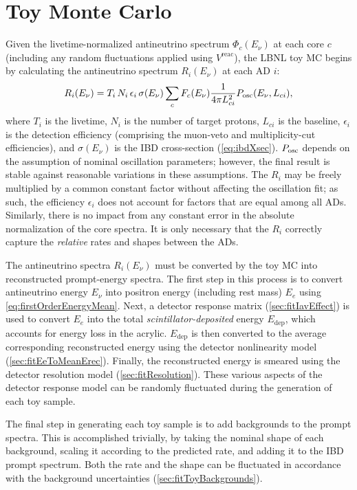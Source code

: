 \documentclass[../thesis.tex]{subfiles}
\begin{document}
\section{Toy Monte Carlo}
\label{sec:fittingToyMC}

Given the livetime-normalized antineutrino spectrum $\Phi_c(E_\nu)$ at each core $c$ (including any random fluctuations applied using $V^{\mathrm{reac}}$), the LBNL toy MC begins by calculating the antineutrino spectrum $R_i(E_\nu)$ at each AD $i$:
\begin{equation}
  \label{eq:fitTrueIbdSpecOverview}
  R_i(E_\nu) = T_i\,N_i\,\epsilon_i\,\sigma(E_\nu) \sum_c F_c(E_\nu) \frac{1}{4\pi L_{ci}^2}
  P_\mathrm{osc}(E_\nu, L_{ci}),
\end{equation}
where $T_i$ is the livetime, $N_i$ is the number of target protons, $L_{ci}$ is the baseline, $\epsilon_i$ is the detection efficiency (comprising the muon-veto and multiplicity-cut efficiencies), and $\sigma(E_\nu)$ is the IBD cross-section (\autoref{eq:ibdXsec}). $P_\mathrm{osc}$ depends on the assumption of nominal oscillation parameters; however, the final result is stable against reasonable variations in these assumptions. The $R_i$ may be freely multiplied by a common constant factor without affecting the oscillation fit; as such, the efficiency $\epsilon_i$ does not account for factors that are equal among all ADs. Similarly, there is no impact from any constant error in the absolute normalization of the core spectra. It is only necessary that the $R_i$ correctly capture the \emph{relative} rates and shapes between the ADs.

The antineutrino spectra $R_i(E_\nu)$ must be converted by the toy MC into reconstructed prompt-energy spectra. The first step in this process is to convert antineutrino energy $E_\nu$ into positron energy (including rest mass) $E_e$ using \autoref{eq:firstOrderEnergyMean}. Next, a detector response matrix (\autoref{sec:fitIavEffect}) is used to convert $E_e$ into the total \emph{scintillator-deposited} energy $E_{\mathrm{dep}}$, which accounts for energy loss in the acrylic. $E_{\mathrm{dep}}$ is then converted to the average corresponding reconstructed energy using the detector nonlinearity model (\autoref{sec:fitEeToMeanErec}). Finally, the reconstructed energy is smeared using the detector resolution model (\autoref{sec:fitResolution}). These various aspects of the detector response model can be randomly fluctuated during the generation of each toy sample.

The final step in generating each toy sample is to add backgrounds to the prompt spectra. This is accomplished trivially, by taking the nominal shape of each background, scaling it according to the predicted rate, and adding it to the IBD prompt spectrum. Both the rate and the shape can be fluctuated in accordance with the background uncertainties (\autoref{sec:fitToyBackgrounds}).
\end{document}
